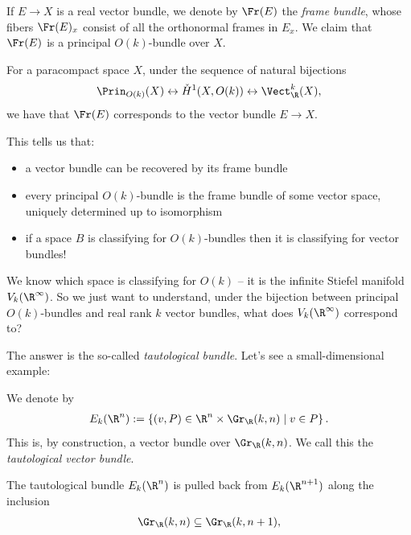 \documentclass[11pt]{book}
\begin{document}
\begin{definition}\label{def:frame-bundle} If $E \to X$ is a real vector bundle, we denote by $\Fr(E)$ the \emph{frame bundle}, whose fibers $\Fr(E)_x$ consist of all the orthonormal frames in $E_x$. We claim that $\Fr(E)$ is a principal $O(k)$-bundle over $X$.
\end{definition}

\begin{exercise}\label{exer:frame-bundle-is-associated} 
For a paracompact space $X$, under the sequence of natural bijections
\begin{align*}
    \Prin_{O(k)}(X) \leftrightarrow \check{H}^1(X,O(k)) \leftrightarrow \Vect_\R^k(X),
\end{align*}
we have that $\Fr(E)$ corresponds to the vector bundle $E \to X$.
\end{exercise}
This tells us that:
\begin{itemize}
    \item a vector bundle can be recovered by its frame bundle
    \item every principal $O(k)$-bundle is the frame bundle of some vector space, uniquely determined up to isomorphism
    \item if a space $B$ is classifying for $O(k)$-bundles then it is classifying for vector bundles!
\end{itemize}

We know which space is classifying for $O(k)$ -- it is the infinite Stiefel manifold $V_k(\R^\infty)$. So we just want to understand, under the bijection between principal $O(k)$-bundles and real rank $k$ vector bundles, what does $V_k(\R^\infty)$ correspond to?

The answer is the so-called \emph{tautological bundle}. Let's see a small-dimensional example:

\begin{notation} We denote by
\begin{align*}
    E_k(\R^n) := \left\{ (v,P) \in \R^n \times \Gr_\R(k,n) \mid v\in P \right\}.
\end{align*}
This is, by construction, a vector bundle over $\Gr_\R(k,n)$. We call this the \emph{tautological vector bundle}.
\end{notation}

\begin{proposition}
The tautological bundle $E_k(\R^n)$ is pulled back from $E_{k}(\R^{n+1})$ along the inclusion
\begin{align*}
    \Gr_\R(k,n) \subseteq \Gr_\R(k,n+1),
\end{align*}
\end{proposition}
\end{document}
